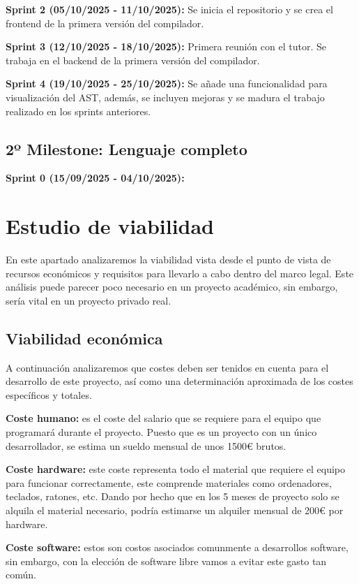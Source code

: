 \textbf{Sprint 2 (05/10/2025 - 11/10/2025):} Se inicia el repositorio y se crea el frontend de la primera versión del compilador.

\textbf{Sprint 3 (12/10/2025 - 18/10/2025):} Primera reunión con el tutor. Se trabaja en el backend de la primera versión del compilador. 

\textbf{Sprint 4 (19/10/2025 - 25/10/2025):} Se añade una funcionalidad para visualización del AST, además, se incluyen mejoras y se madura el trabajo realizado en los sprints anteriores.   

\subsection{2º Milestone: Lenguaje completo}

\textbf{Sprint 0 (15/09/2025 - 04/10/2025):} 

\section{Estudio de viabilidad}
En este apartado analizaremos la viabilidad vista desde el punto de vista de recursos económicos y requisitos para llevarlo a cabo dentro del marco legal. Este análisis puede parecer poco necesario en un proyecto académico, sin embargo, sería vital en un proyecto privado real.

\subsection{Viabilidad económica}
A continuación analizaremos que costes deben ser tenidos en cuenta para el desarrollo de este proyecto, así como una determinación aproximada de los costes específicos y totales.

\textbf{Coste humano:} es el coste del salario que se requiere para el equipo que programará durante el proyecto. Puesto que es un proyecto con un único desarrollador, se estima un sueldo mensual de unos 1500€ brutos.

\textbf{Coste hardware:} este coste representa todo el material que requiere el equipo para funcionar correctamente, este comprende materiales como ordenadores, teclados, ratones, etc. Dando por hecho que en los 5 meses de proyecto solo se alquila el material necesario, podría estimarse un alquiler mensual de 200€ por hardware.

\textbf{Coste software:} estos son costos asociados comunmente a desarrollos software, sin embargo, con la elección de software libre vamos a evitar este gasto tan común.

